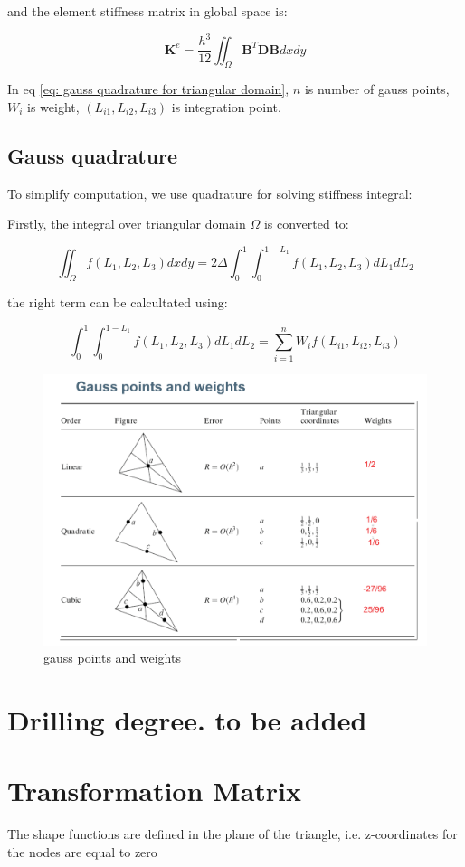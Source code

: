 and the element stiffness matrix   in global space is:

\begin{equation}\label{eq: gauss quadrature for triangular domain}
\mathbf{K}^e = \frac{h^3}{12} \iint_\Omega \mathbf{B}^T \mathbf{DB} dx dy
\end{equation}

In eq \ref{eq: gauss quadrature for triangular domain}, $ n $ is number of gauss points, $ W_i $ is weight, $ (L_{i1}, L_{i2}, L_{i3}) $ is integration point.

\subsection{Gauss quadrature}
To simplify computation, we use quadrature for solving stiffness integral:

Firstly, the integral over triangular domain $ \Omega $ is converted to:

\begin{equation}\label{key}
\iint_\Omega f(L_1, L_2, L_3) dx dy = 2 \Delta \int_{0}^{1} \int_{0}^{1-L_1} f(L_1, L_2, L_3) dL_1 dL_2
\end{equation}

the right term can be calcultated using:

\begin{equation}\label{key}
\int_{0}^{1} \int_{0}^{1-L_1} f(L_1, L_2, L_3) dL_1 dL_2 = \sum_{i=1}^{n} W_i f(L_{i1}, L_{i2}, L_{i3})
\end{equation}

\begin{figure}[h!]
\centering
\includegraphics[width=0.4\linewidth]{figures/gauss_points_and_weights}
\caption{gauss points and weights}
\label{fig: gauss points and weights}
\end{figure}

\section{Drilling degree. to be added}

\section{Transformation Matrix}
The shape functions are defined in the plane of the triangle, i.e. z-coordinates for the nodes are equal to zero

